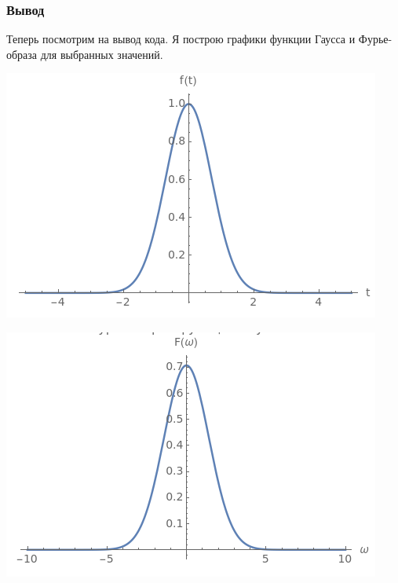 \documentclass[a4paper,12pt]{article}
\begin{document}
\subsubsection{Вывод}
Теперь посмотрим на вывод кода. Я построю графики функции Гаусса и Фурье-образа для выбранных значений.
\begin{center}
\begin{minipage}{0.48\textwidth}
  \centering
  \includegraphics[width=\linewidth]{images/4f11.png}
\end{minipage}
\hfill
\begin{minipage}{0.48\textwidth}
  \centering
  \includegraphics[width=\linewidth]{images/4F11.png}
\end{minipage}
\end{center}
\end{document}
